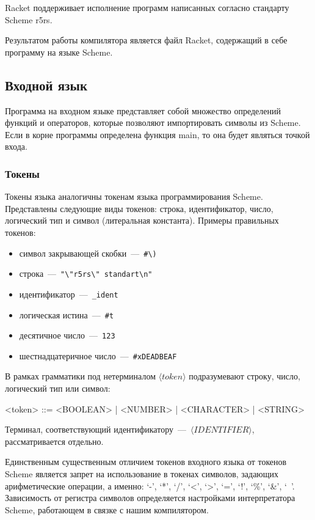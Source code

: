 \documentclass[12pt,a4paper,oneside]{extarticle}
\begin{document}
        Racket поддерживает исполнение программ написанных согласно стандарту Scheme r5rs.

        Результатом работы компилятора является файл Racket, содержащий в себе программу на языке Scheme.
    \clearpage

    \subsection{Входной язык}
        Программа на входном языке представляет собой множество определений функций и операторов, которые позволяют импортировать символы из Scheme.
        Если в корне программы определена функция main, то она будет являться точкой входа.

        \subsubsection{Токены}
            Токены языка аналогичны токенам языка программирования Scheme.
            Представлены следующие виды токенов: строка, идентификатор, число, логический тип и символ (литеральная константа). Примеры правильных токенов: 

            \begin{itemize}
                \item символ закрывающей скобки~---~\lstinline$#\)$
                \item строка~---~\lstinline$"\"r5rs\" standart\n"$
                \item идентификатор~---~\lstinline$_ident$
                \item логическая истина~---~\lstinline$#t$
                \item десятичное число~---~\lstinline$123$
                \item шестнадцатеричное число~---~\lstinline$#xDEADBEAF$
            \end{itemize}

            В рамках грамматики под нетерминалом $\langle token\rangle$ подразумевают строку, число, логический тип или символ:
            \begin{grammar}
                <token> ::= <BOOLEAN> | <NUMBER> | <CHARACTER> | <STRING>
            \end{grammar}
            Терминал, соответствующий идентификатору~---~$\langle IDENTIFIER \rangle$, рассматривается отдельно.

            Единственным существенным отличием токенов входного языка от токенов Scheme является запрет на использование в токенах символов, задающих арифметические операции, а именно: `-', `*', `/', `<', `>', `=', `!', `\%', `\&', `~'.
            Зависимость от регистра символов определяется настройками интерпретатора Scheme, работающем в связке с нашим компилятором.            
\end{document}
